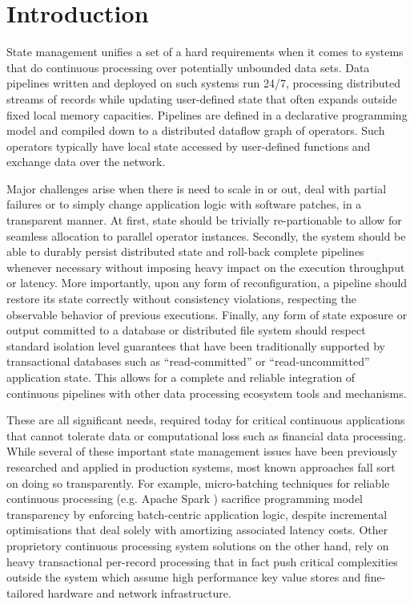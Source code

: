 
\section{Introduction}
\label{sec:intro}

State management unifies a set of a hard requirements when it comes to systems that do continuous processing over potentially unbounded data sets. Data pipelines written and deployed on such systems run 24/7, processing distributed streams of records while updating user-defined state that often expands outside fixed local memory capacities. Pipelines are defined in a declarative programming model and compiled down to a distributed dataflow graph of operators. Such operators typically have local state accessed by user-defined functions and exchange data over the network.

Major challenges arise when there is need to scale in or out, deal with partial failures or to simply change application logic with software patches, in a transparent manner. At first, state should be trivially re-partionable to allow for seamless allocation to parallel operator instances. Secondly, the system should be able to durably persist distributed state and roll-back complete pipelines whenever necessary without imposing heavy impact on the execution throughput or latency. More importantly, upon any form of reconfiguration, a pipeline should restore its state correctly without consistency violations, respecting the observable behavior of previous executions. Finally, any form of state exposure or output committed to a database or distributed file system should respect standard isolation level guarantees that have been traditionally supported by transactional databases such as ``read-committed'' or ``read-uncommitted'' application state. This allows for a complete and reliable integration of continuous pipelines with other data processing ecosystem tools and mechanisms.


These are all significant needs, required today for critical continuous applications that cannot tolerate data or computational loss such as financial data processing. 
While several of these important state management issues have been previously researched and applied in production systems, most known approaches fall sort on doing so transparently. For example, micro-batching techniques for reliable continuous processing (e.g. Apache Spark \cite{zaharia2012discretized}) sacrifice programming model transparency by enforcing batch-centric application logic, despite incremental optimisations \cite{venkataramandrizzle} that deal solely with amortizing associated latency costs. Other proprietory continuous processing system solutions \cite{millwheel} on the other hand, rely on heavy transactional per-record processing that in fact push critical complexities outside the system which assume high performance key value stores and fine-tailored hardware and network infrastructure. 

